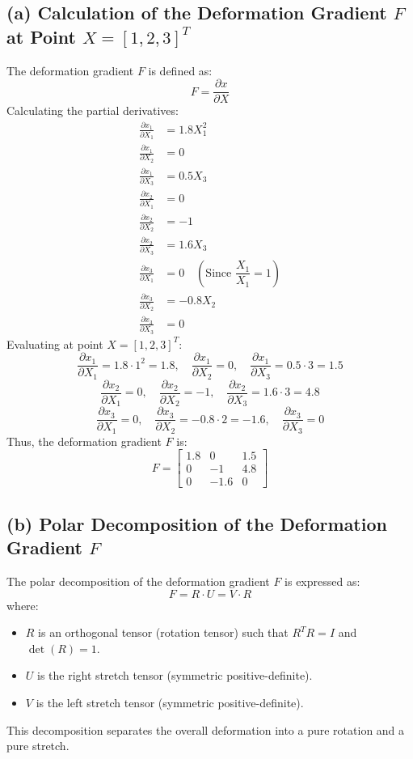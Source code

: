 \documentclass{article}
\begin{document}
\subsection{(a) Calculation of the Deformation Gradient $ F $ at Point $ X = [1, 2, 3]^T $}
The deformation gradient $ F $ is defined as:
$$
F = \dfrac{\partial x}{\partial X}
$$
Calculating the partial derivatives:
\begin{equation*}
    \begin{align*}
    \frac{\partial x_1}{\partial X_1} &= 1.8 X_1^2 \\
    \frac{\partial x_1}{\partial X_2} &= 0 \\
    \frac{\partial x_1}{\partial X_3} &= 0.5 X_3 \\
    \frac{\partial x_2}{\partial X_1} &= 0 \\
    \frac{\partial x_2}{\partial X_2} &= -1 \\
    \frac{\partial x_2}{\partial X_3} &= 1.6 X_3 \\
    \frac{\partial x_3}{\partial X_1} &= 0 \quad (\text{Since } \dfrac{X_1}{X_1} = 1) \\
    \frac{\partial x_3}{\partial X_2} &= -0.8 X_2 \\
    \frac{\partial x_3}{\partial X_3} &= 0
    \end{align*}
\end{equation*}
Evaluating at point $ X = [1, 2, 3]^T $:
$$
\frac{\partial x_1}{\partial X_1} = 1.8 \cdot 1^2 = 1.8, \quad \frac{\partial x_1}{\partial X_2} = 0, \quad \frac{\partial x_1}{\partial X_3} = 0.5 \cdot 3 = 1.5
$$
$$
\frac{\partial x_2}{\partial X_1} = 0, \quad \frac{\partial x_2}{\partial X_2} = -1, \quad \frac{\partial x_2}{\partial X_3} = 1.6 \cdot 3 = 4.8
$$
$$
\frac{\partial x_3}{\partial X_1} = 0, \quad \frac{\partial x_3}{\partial X_2} = -0.8 \cdot 2 = -1.6, \quad \frac{\partial x_3}{\partial X_3} = 0
$$
Thus, the deformation gradient $ F $ is:
$$
F = \begin{bmatrix}
1.8 & 0 & 1.5 \\
0 & -1 & 4.8 \\
0 & -1.6 & 0
\end{bmatrix}
$$

\subsection{(b) Polar Decomposition of the Deformation Gradient $ F $}
The polar decomposition of the deformation gradient $ F $ is expressed as:
$$
F = R \cdot U = V \cdot R
$$
where:
\begin{itemize}
    \item $ R $ is an orthogonal tensor (rotation tensor) such that $ R^T R = I $ and $ \det(R) = 1 $.
    \item $ U $ is the right stretch tensor (symmetric positive-definite).
    \item $ V $ is the left stretch tensor (symmetric positive-definite).
\end{itemize}
This decomposition separates the overall deformation into a pure rotation and a pure stretch.
\end{document}
